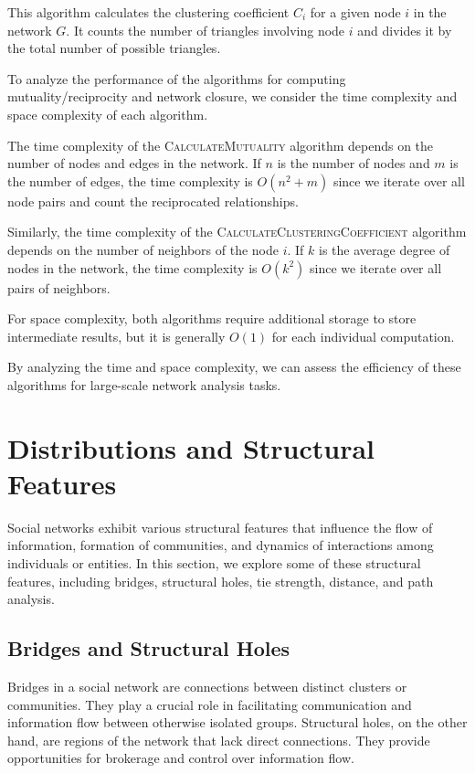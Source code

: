 \documentclass[12pt]{book} %
\begin{document}
This algorithm calculates the clustering coefficient \(C_i\) for a given node \(i\) in the network \(G\). It counts the number of triangles involving node \(i\) and divides it by the total number of possible triangles.

To analyze the performance of the algorithms for computing mutuality/reciprocity and network closure, we consider the time complexity and space complexity of each algorithm.

The time complexity of the \textsc{CalculateMutuality} algorithm depends on the number of nodes and edges in the network. If \(n\) is the number of nodes and \(m\) is the number of edges, the time complexity is \(O(n^2 + m)\) since we iterate over all node pairs and count the reciprocated relationships.

Similarly, the time complexity of the \textsc{CalculateClusteringCoefficient} algorithm depends on the number of neighbors of the node \(i\). If \(k\) is the average degree of nodes in the network, the time complexity is \(O(k^2)\) since we iterate over all pairs of neighbors.

For space complexity, both algorithms require additional storage to store intermediate results, but it is generally \(O(1)\) for each individual computation.

By analyzing the time and space complexity, we can assess the efficiency of these algorithms for large-scale network analysis tasks.

\section{Distributions and Structural Features}

Social networks exhibit various structural features that influence the flow of information, formation of communities, and dynamics of interactions among individuals or entities. In this section, we explore some of these structural features, including bridges, structural holes, tie strength, distance, and path analysis.

\subsection{Bridges and Structural Holes}

Bridges in a social network are connections between distinct clusters or communities. They play a crucial role in facilitating communication and information flow between otherwise isolated groups. Structural holes, on the other hand, are regions of the network that lack direct connections. They provide opportunities for brokerage and control over information flow.
\end{document}
